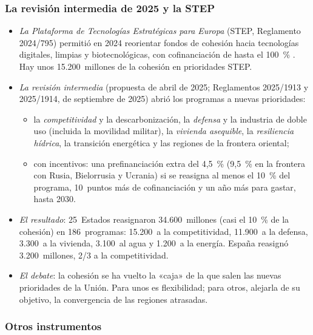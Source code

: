 \documentclass[11pt]{article}
\begin{document}
\subsubsection{La revisión intermedia de 2025 y la STEP}\label{sec:revision-intermedia}

\begin{itemize}
\item \emph{La Plataforma de Tecnologías Estratégicas para Europa} (STEP, Reglamento 2024/795) permitió en 2024 reorientar fondos de cohesión hacia tecnologías digitales, limpias y biotecnológicas, con cofinanciación de hasta el 100~\% . Hay unos 15.200~millones de la cohesión en prioridades STEP\nocite{CE2026Cohesiondata}.
\item \emph{La revisión intermedia} (propuesta de abril de 2025; Reglamentos 2025/1913 y 2025/1914, de septiembre de 2025) abrió los programas a nuevas prioridades\nocite{UE2025RevisionIntermedia}:
  \begin{itemize}
  \item la \emph{competitividad} y la descarbonización, la \emph{defensa} y la industria de doble uso (incluida la movilidad militar), la \emph{vivienda asequible}, la \emph{resiliencia hídrica}, la transición energética y las regiones de la frontera oriental;
  \item con incentivos: una prefinanciación extra del 4,5~\% (9,5~\% en la frontera con Rusia, Bielorrusia y Ucrania) si se reasigna al menos el 10~\% del programa, 10~puntos más de cofinanciación y un año más para gastar, hasta 2030.
  \end{itemize}
\item \emph{El resultado}: 25~Estados reasignaron 34.600~millones (casi el 10~\% de la cohesión) en 186~programas: 15.200~a la competitividad, 11.900~a la defensa, 3.300~a la vivienda, 3.100~al agua y 1.200~a la energía. España reasignó 3.200~millones, 2/3 a la competitividad\nocite{CE2026RevisionIntermedia}.
\item \emph{El debate}: la cohesión se ha vuelto la «caja» de la que salen las nuevas prioridades de la Unión. Para unos es flexibilidad; para otros, alejarla de su objetivo, la convergencia de las regiones atrasadas.
\end{itemize}

\subsubsection{Otros instrumentos}\label{sec:otros-instrumentos}
\end{document}
